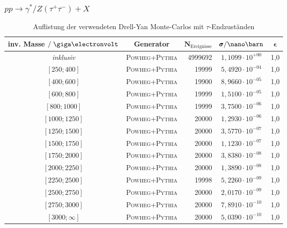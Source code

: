 \subsubsection*{$pp \rightarrow \gamma^*/Z(\tau^+\tau^-) + X$}
\begin{table}[h]
    \footnotesize
    \centering
    \begin{tabular}{|c|c|r|c|c|}
        \hline
        \bf{inv. Masse} $/\GeV$ & \bf{Generator} & $\pmb N_\text{Ereignisse}$ &
        $\pmb\sigma / \nano\barn$ & $\pmb\epsilon$ \\
        \hline \hline
        \textit{inklusiv} & \textsc{Powheg+Pythia} & 4999692 & $1,1099\cdot 10^{+00}$ & 1,0 \\
        $[250 ; 400]$     & \textsc{Powheg+Pythia} & 19999   & $5,4920\cdot 10^{-04}$ & 1,0 \\
        $[400 ; 600]$     & \textsc{Powheg+Pythia} & 19900   & $8,9660\cdot 10^{-05}$ & 1,0 \\
        $[600 ; 800]$     & \textsc{Powheg+Pythia} & 19999   & $1,5100\cdot 10^{-05}$ & 1,0 \\
        $[800 ; 1000]$    & \textsc{Powheg+Pythia} & 19999   & $3,7500\cdot 10^{-06}$ & 1,0 \\
        $[1000 ; 1250]$   & \textsc{Powheg+Pythia} & 20000   & $1,2930\cdot 10^{-06}$ & 1,0 \\
        $[1250 ; 1500]$   & \textsc{Powheg+Pythia} & 20000   & $3,5770\cdot 10^{-07}$ & 1,0 \\
        $[1500 ; 1750]$   & \textsc{Powheg+Pythia} & 20000   & $1,1230\cdot 10^{-07}$ & 1,0 \\
        $[1750 ; 2000]$   & \textsc{Powheg+Pythia} & 20000   & $3,8380\cdot 10^{-08}$ & 1,0 \\
        $[2000 ; 2250]$   & \textsc{Powheg+Pythia} & 20000   & $1,3890\cdot 10^{-08}$ & 1,0 \\
        $[2250 ; 2500]$   & \textsc{Powheg+Pythia} & 19998   & $5,2260\cdot 10^{-09}$ & 1,0 \\
        $[2500 ; 2750]$   & \textsc{Powheg+Pythia} & 20000   & $2,0170\cdot 10^{-09}$ & 1,0 \\
        $[2750 ; 3000]$   & \textsc{Powheg+Pythia} & 20000   & $7,8910\cdot 10^{-10}$ & 1,0 \\
        $[3000 ; \infty]$ & \textsc{Powheg+Pythia} & 20000   & $5,0390\cdot 10^{-10}$ & 1,0 \\
        \hline
    \end{tabular}
    \caption{Auflistung der verwendeten Drell-Yan Monte-Carlos mit $\tau$-Endzuständen} 
\end{table}
\FloatBarrier

